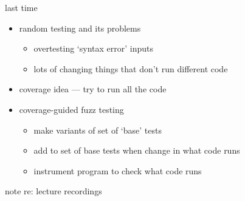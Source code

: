 \date{}
\title{}
\date{}
\usepackage[outputdir=latex.out]{minted}

\begin{frame}
    \titlepage
\end{frame}


\begin{frame}{last time}
    \begin{itemize}
    \item random testing and its problems
        \begin{itemize}
        \item overtesting `syntax error' inputs
        \item lots of changing things that don't run different code
        \end{itemize}
    \item coverage idea --- try to run all the code
    \item coverage-guided fuzz testing
        \begin{itemize}
        \item make variants of set of `base' tests
        \item add to set of base tests when change in what code runs
        \item instrument program to check what code runs
        \end{itemize}
    \end{itemize}
\end{frame}

\begin{frame}{note re: lecture recordings}
\end{frame}



